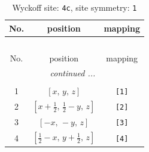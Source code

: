 \documentclass[fleqn,8pt]{jsarticle}
\begin{document}
\begin{longtable}{ccc}
\caption{Wyckoff site: {\tt 4c}, site symmetry: {\tt 1}}
 \\
 \hline \hline
No. & position & mapping \\ \hline \endfirsthead

\multicolumn{2}{l}{\tablename\ \thetable{}} \\
 \hline \hline
No. & position & mapping \\ \hline \endhead

 \hline \hline
\multicolumn{2}{r}{\footnotesize\it continued ...} \\ \endfoot

 \hline \hline
\multicolumn{2}{r}{} \\ \endlastfoot

1 & $\left[ x,\, y,\, z \right]$ & {\tt [1]} \\ \hline
2 & $\left[ x + \frac{1}{2},\, \frac{1}{2} - y,\, z \right]$ & {\tt [2]} \\ \hline
3 & $\left[ - x,\, - y,\, z \right]$ & {\tt [3]} \\ \hline
4 & $\left[ \frac{1}{2} - x,\, y + \frac{1}{2},\, z \right]$ & {\tt [4]} \\
\end{longtable}
\end{document}
